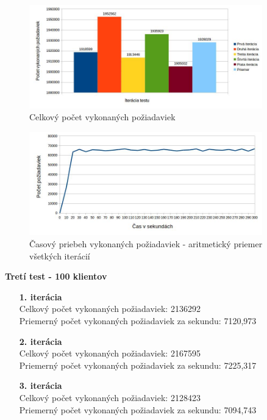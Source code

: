\documentclass[12pt,oneside,final]{fithesis-utf8}
\begin{document}
\begin{itemize}
\begin{itemize}
\end{itemize}

\begin{figure}[H]
  \centering
      \includegraphics[width=0.9\textwidth]{gatling2_2.jpg}
  \caption{Celkový počet vykonaných požiadaviek}
\end{figure}

\begin{figure}[H]
  \centering
      \includegraphics[width=0.9\textwidth]{gatling2_2_distr.jpg}
  \caption{Časový priebeh vykonaných požiadaviek - aritmetický priemer všetkých iterácií}
\end{figure}

\textbf{Tretí test - 100 klientov}
\begin{itemize}

\item[\textbf{1. iterácia}]\ \\
Celkový počet vykonaných požiadaviek: 2136292\\
Priemerný počet vykonaných požiadaviek za sekundu: 7120,973

\item[\textbf{2. iterácia}]\ \\
Celkový počet vykonaných požiadaviek: 2167595\\
Priemerný počet vykonaných požiadaviek za sekundu: 7225,317

\item[\textbf{3. iterácia}]\ \\
Celkový počet vykonaných požiadaviek: 2128423\\
Priemerný počet vykonaných požiadaviek za sekundu: 7094,743


\end{itemize}
\end{itemize}
\end{document}
